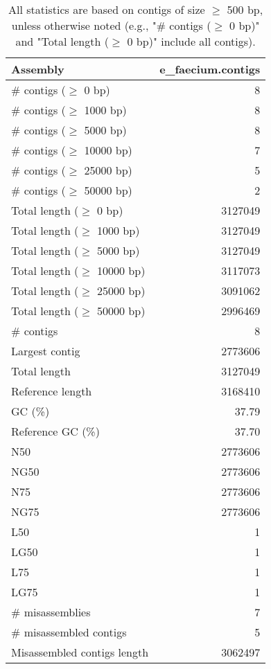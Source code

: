 \documentclass[12pt,a4paper]{article}
\begin{document}
\begin{table}[ht]
\begin{center}
\caption{All statistics are based on contigs of size $\geq$ 500 bp, unless otherwise noted (e.g., "\# contigs ($\geq$ 0 bp)" and "Total length ($\geq$ 0 bp)" include all contigs).}
\begin{tabular}{|l*{1}{|r}|}
\hline
Assembly & e\_faecium.contigs \\ \hline
\# contigs ($\geq$ 0 bp) & 8 \\ \hline
\# contigs ($\geq$ 1000 bp) & 8 \\ \hline
\# contigs ($\geq$ 5000 bp) & 8 \\ \hline
\# contigs ($\geq$ 10000 bp) & 7 \\ \hline
\# contigs ($\geq$ 25000 bp) & 5 \\ \hline
\# contigs ($\geq$ 50000 bp) & 2 \\ \hline
Total length ($\geq$ 0 bp) & 3127049 \\ \hline
Total length ($\geq$ 1000 bp) & 3127049 \\ \hline
Total length ($\geq$ 5000 bp) & 3127049 \\ \hline
Total length ($\geq$ 10000 bp) & 3117073 \\ \hline
Total length ($\geq$ 25000 bp) & 3091062 \\ \hline
Total length ($\geq$ 50000 bp) & 2996469 \\ \hline
\# contigs & 8 \\ \hline
Largest contig & 2773606 \\ \hline
Total length & 3127049 \\ \hline
Reference length & 3168410 \\ \hline
GC (\%) & 37.79 \\ \hline
Reference GC (\%) & 37.70 \\ \hline
N50 & 2773606 \\ \hline
NG50 & 2773606 \\ \hline
N75 & 2773606 \\ \hline
NG75 & 2773606 \\ \hline
L50 & 1 \\ \hline
LG50 & 1 \\ \hline
L75 & 1 \\ \hline
LG75 & 1 \\ \hline
\# misassemblies & 7 \\ \hline
\# misassembled contigs & 5 \\ \hline
Misassembled contigs length & 3062497 \\ \hline

\end{tabular}
\end{center}
\end{table}
\end{document}
